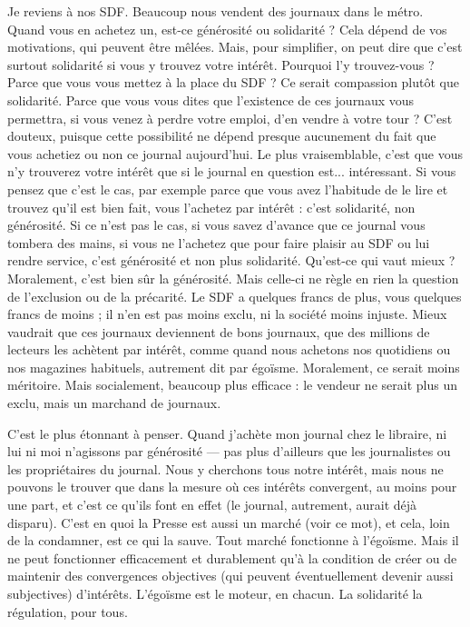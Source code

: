 Je reviens à nos SDF. Beaucoup nous vendent des journaux dans le métro.
Quand vous en achetez un, est-ce générosité ou solidarité ? Cela dépend de vos
motivations, qui peuvent être mêlées. Mais, pour simplifier, on peut dire que
c’est surtout solidarité si vous y trouvez votre intérêt. Pourquoi l'y trouvez-vous ?
Parce que vous vous mettez à la place du SDF ? Ce serait compassion
plutôt que solidarité. Parce que vous vous dites que l’existence de ces journaux
vous permettra, si vous venez à perdre votre emploi, d’en vendre à votre tour ?
C’est douteux, puisque cette possibilité ne dépend presque aucunement du fait
que vous achetiez ou non ce journal aujourd’hui. Le plus vraisemblable, c’est
que vous n’y trouverez votre intérêt que si le journal en question est... intéressant.
Si vous pensez que c’est le cas, par exemple parce que vous avez l’habitude
de le lire et trouvez qu’il est bien fait, vous l’achetez par intérêt : c’est solidarité,
non générosité. Si ce n’est pas le cas, si vous savez d’avance que ce journal vous
tombera des mains, si vous ne l’achetez que pour faire plaisir au SDF ou lui
rendre service, c’est générosité et non plus solidarité. Qu'est-ce qui vaut
mieux ? Moralement, c’est bien sûr la générosité. Mais celle-ci ne règle en rien
la question de l’exclusion ou de la précarité. Le SDF a quelques francs de plus,
vous quelques francs de moins ; il n’en est pas moins exclu, ni la société moins
injuste. Mieux vaudrait que ces journaux deviennent de bons journaux, que des
millions de lecteurs les achètent par intérêt, comme quand nous achetons nos
quotidiens ou nos magazines habituels, autrement dit par égoïsme. Moralement,
ce serait moins méritoire. Mais socialement, beaucoup plus efficace : le
vendeur ne serait plus un exclu, mais un marchand de journaux.

C’est le plus étonnant à penser. Quand j'achète mon journal chez le
libraire, ni lui ni moi n’agissons par générosité — pas plus d’ailleurs que les journalistes
ou les propriétaires du journal. Nous y cherchons tous notre intérêt,
mais nous ne pouvons le trouver que dans la mesure où ces intérêts convergent,
au moins pour une part, et c’est ce qu’ils font en effet (le journal, autrement,
aurait déjà disparu). C’est en quoi la Presse est aussi un marché (voir ce mot),
et cela, loin de la condamner, est ce qui la sauve. Tout marché fonctionne à
l’égoïsme. Mais il ne peut fonctionner efficacement et durablement qu’à la
condition de créer ou de maintenir des convergences objectives (qui peuvent
éventuellement devenir aussi subjectives) d’intérêts. L'égoïsme est le moteur, en
chacun. La solidarité la régulation, pour tous.

